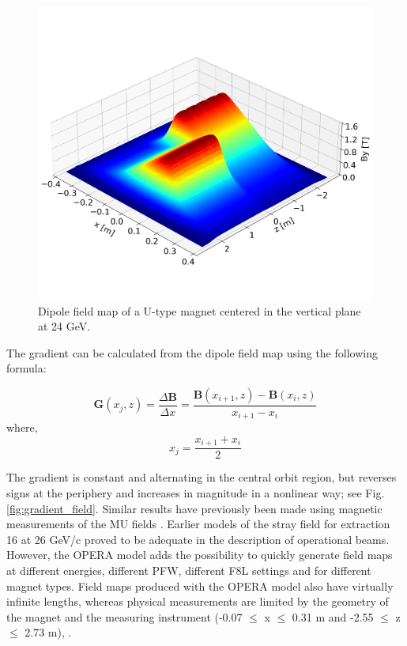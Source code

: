 \documentclass[a4paper,
               biblatex,     %
               keeplastbox,   %
               ]{jacow}
\begin{document}
\begin{figure}[!htb]
   \centering
   \includegraphics*[width=1.0\columnwidth, trim={0 2.9cm 0 4.3cm},clip]{dipole_field.png}
   \caption{Dipole field map of a U-type magnet centered in the vertical plane at 24 GeV.}
   \label{fig:dipole_field}
\end{figure}

The gradient can be calculated from the dipole field map using the following formula:
 
$$ \boldsymbol{G}(x_{j},z) = \frac{\Delta\boldsymbol{B}}{\Delta x} = \frac{\boldsymbol{B}(x_{i+1},z) - \boldsymbol{B}(x_{i},z)}{x_{i+1}-x_{i}} $$
where,
$$ x_{j} = \frac{x_{i+1} + x_{i}}{{2}} $$
 
The gradient is constant and alternating in the central orbit region, but reverses signs at the periphery and increases in magnitude in a nonlinear way; see Fig.\ref{fig:gradient_field}. Similar results have previously been made using magnetic measurements of the MU fields \cite{manglunki_beam_1997}. Earlier models of the stray field for extraction 16 at 26 GeV/c proved to be adequate in the description of operational beams. However, the OPERA model adds the possibility to quickly generate field maps at different energies, different PFW, different F8L settings and for different magnet types. Field maps produced with the OPERA model also have virtually infinite lengths, whereas physical measurements are limited by the geometry of the magnet and the measuring instrument (-0.07 $\leq$ x $\leq$ 0.31 m and -2.55 $\leq$ z $\leq$ 2.73 m), \cite{manglunki_beam_1997}.
\end{document}
